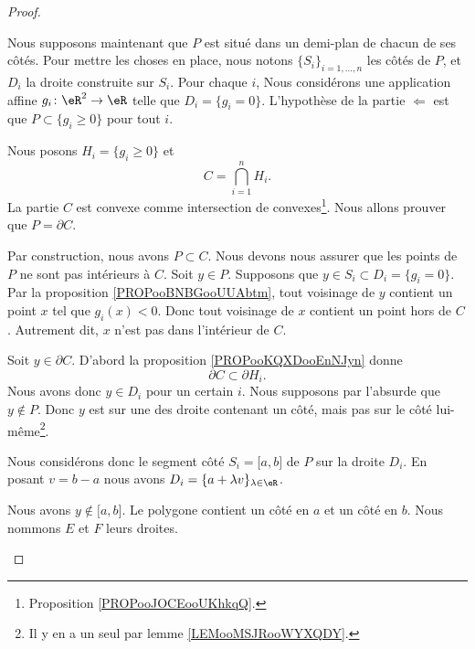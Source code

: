 \begin{proof}
\begin{subproof}
		\spitem[\( \Leftarrow\)]
		Nous supposons maintenant que \( P\) est situé dans un demi-plan de chacun de ses côtés. Pour mettre les choses en place, nous notons \( \{ S_i \}_{i=1,\ldots,n}\) les  côtés de \( P\), et \( D_i\) la droite construite sur \( S_i\). Pour chaque \( i\), Nous considérons une application affine \(g_i \colon \eR^2\to \eR  \) telle que \( D_i=\{ g_i=0 \}\). L'hypothèse de la partie \( \Leftarrow\) est que \( P\subset \{ g_i\geq 0 \}\) pour tout \( i\).

		Nous posons \( H_i=\{ g_i\geq 0 \}\) et
		\begin{equation}
			C=\bigcap_{i=1}^nH_i.
		\end{equation}
		La partie \( C\) est convexe comme intersection de convexes\footnote{Proposition \ref{PROPooJOCEooUKhkqQ}.}. Nous allons prouver que \( P=\partial C\).
		\begin{subproof}
			Par construction, nous avons \( P\subset C\). Nous devons nous assurer que les points de \( P\) ne sont pas intérieurs à \( C\). Soit \( y\in P\). Supposons que \( y\in S_i\subset D_i=\{ g_i=0 \}\). Par la proposition \ref{PROPooBNBGooUUAbtm}, tout voisinage de \( y\) contient un point \( x\) tel que \( g_i(x)<0\). Donc tout voisinage de \( x\) contient un point hors de \( C\). Autrement dit, \( x\) n'est pas dans l'intérieur de \( C\).

			Soit \( y\in\partial C\). D'abord la proposition \ref{PROPooKQXDooEnNJyn} donne
			\begin{equation}
				\partial C\subset \partial H_i.
			\end{equation}
			Nous avons donc \( y\in D_i\) pour un certain \( i\). Nous supposons par l'absurde que \( y\not\in P\). Donc \( y\) est sur une des droite contenant un côté, mais pas sur le côté lui-même\footnote{Il y en a un seul par lemme \ref{LEMooMSJRooWYXQDY}.}.

			Nous considérons donc le segment côté \( S_i=\mathopen[ a,b\mathclose]\) de \( P\) sur la droite \( D_i\). En posant \( v=b-a\) nous avons \( D_i=\{ a+\lambda v \}_{\lambda\in \eR}\).


			Nous avons \( y\not\in \mathopen[ a,b\mathclose]\). Le polygone contient un côté en \( a\) et un côté en  \( b\). Nous nommons \( E\) et \( F\) leurs droites.


\end{subproof}
\end{subproof}
\end{proof}
